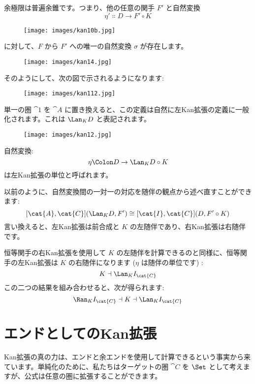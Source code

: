 \noindent
余極限は普遍余錐です。つまり、他の任意の関手 $F'$ と自然変換
\[\eta' \Colon D \to F' \circ K\]

\begin{figure}[H]
  \centering
  \texttt{[image: images/kan10b.jpg]}
\end{figure}

\noindent
に対して、$F$ から $F'$ への唯一の自然変換 $\sigma$ が存在します。

\begin{figure}[H]
  \centering
  \texttt{[image: images/kan14.jpg]}
\end{figure}

\noindent
そのようにして、次の図で示されるようになります:

\begin{figure}[H]
  \centering
  \texttt{[image: images/kan112.jpg]}
\end{figure}

\noindent
単一の圏 $\cat{1}$ を $\cat{A}$ に置き換えると、この定義は自然に左Kan拡張の定義に一般化されます。これは $\Lan_{K}D$ と表記されます。

\begin{figure}[H]
  \centering
  \texttt{[image: images/kan12.jpg]}
\end{figure}

\noindent
自然変換:
\[\eta \Colon D \to \Lan_{K}D \circ K\]
は左Kan拡張の単位と呼ばれます。

以前のように、自然変換間の一対一の対応を随伴の観点から述べ直すことができます:
\[[\cat{A}, \cat{C}](\Lan_{K}D, F') \cong [\cat{I}, \cat{C}](D, F' \circ K)\]
言い換えると、左Kan拡張は前合成と $K$ の左随伴であり、右Kan拡張は右随伴です。

恒等関手の右Kan拡張を使用して $K$ の左随伴を計算できるのと同様に、恒等関手の左Kan拡張は $K$ の右随伴になります ($\eta$ は随伴の単位です) :
\[K \dashv \Lan_{K}I_{\cat{C}}\]
この二つの結果を組み合わせると、次が得られます:
\[\Ran_{K}I_{\cat{C}} \dashv K \dashv \Lan_{K}I_{\cat{C}}\]

\section{エンドとしてのKan拡張}

Kan拡張の真の力は、エンドと余エンドを使用して計算できるという事実から来ています。単純化のために、私たちはターゲットの圏 $\cat{C}$ を $\Set$ として考えますが、公式は任意の圏に拡張することができます。

